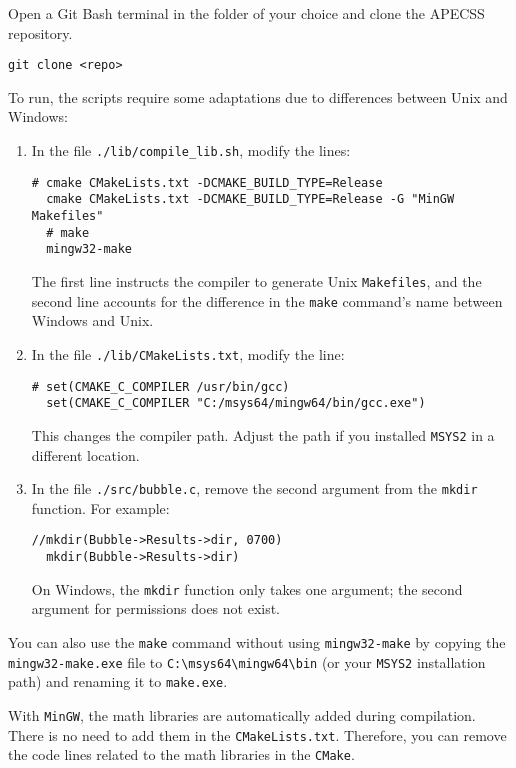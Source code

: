 Open a Git Bash terminal in the folder of your choice and clone the APECSS repository.
\begin{lstlisting}[style=CStyle,numbers=none]
  git clone <repo>\end{lstlisting}

To run, the scripts require some adaptations due to differences between Unix and Windows:
\vspace{-1em}
\begin{enumerate}[noitemsep]
\item In the file {\tt ./lib/compile\_lib.sh}, modify the lines:
\begin{lstlisting}[style=CStyle,numbers=none]
  # cmake CMakeLists.txt -DCMAKE_BUILD_TYPE=Release
  cmake CMakeLists.txt -DCMAKE_BUILD_TYPE=Release -G "MinGW Makefiles"
  # make
  mingw32-make\end{lstlisting}
The first line instructs the compiler to generate Unix {\tt Makefiles}, and the second line accounts for the difference in the {\tt make} command's name between Windows and Unix.
\item  In the file {\tt ./lib/CMakeLists.txt}, modify the line:
\begin{lstlisting}[style=CStyle,numbers=none]
  # set(CMAKE_C_COMPILER /usr/bin/gcc)
  set(CMAKE_C_COMPILER "C:/msys64/mingw64/bin/gcc.exe")\end{lstlisting}
This changes the compiler path. Adjust the path if you installed {\tt MSYS2} in a different location.
\item In the file {\tt ./src/bubble.c}, remove the second argument from the {\tt mkdir} function. For example:
\begin{lstlisting}[style=CStyle,numbers=none]
  //mkdir(Bubble->Results->dir, 0700)
  mkdir(Bubble->Results->dir)\end{lstlisting}
On Windows, the {\tt mkdir} function only takes one argument; the second argument for permissions does not exist.
\end{enumerate}

You can also use the {\tt make} command without using {\tt mingw32-make} by copying the {\tt mingw32-make.exe} file to {\tt C:\textbackslash msys64\textbackslash mingw64\textbackslash bin} (or your {\tt MSYS2} installation path) and renaming it to {\tt make.exe}.

With {\tt MinGW}, the math libraries are automatically added during compilation. There is no need to add them in the {\tt CMakeLists.txt}. Therefore, you can remove the code lines related to the math libraries in the {\tt CMake}.

